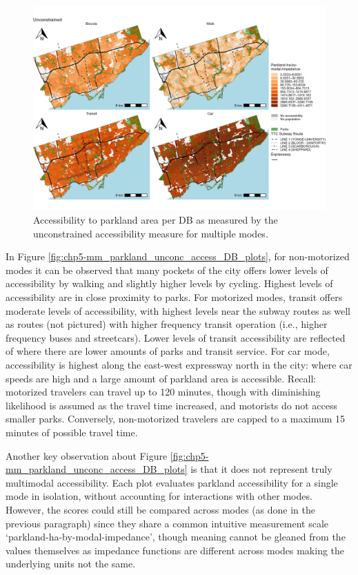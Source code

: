 \documentclass[
11pt, %
oneside, %
english, %
singlespacing, %
]{macthesis} %
\begin{document}
\begin{figure}

{\centering \includegraphics[width=6in]{./data/figures/chp5-mm_parkland_unconc_access_DB_plots} 

}

\caption{\label{fig:chp5-mm_parkland_unconc_access_DB_plots}Accessibility to parkland area per DB as measured by the unconstrained accessibility measure for multiple modes.}\label{fig:unnamed-chunk-74}
\end{figure}

In Figure \ref{fig:chp5-mm_parkland_unconc_access_DB_plots}, for non-motorized modes it can be observed that many pockets of the city offers lower levels of accessibility by walking and slightly higher levels by cycling. Highest levels of accessibility are in close proximity to parks. For motorized modes, transit offers moderate levels of accessibility, with highest levels near the subway routes as well as routes (not pictured) with higher frequency transit operation (i.e., higher frequency buses and streetcars). Lower levels of transit accessibility are reflected of where there are lower amounts of parks and transit service. For car mode, accessibility is highest along the east-west expressway north in the city: where car speeds are high and a large amount of parkland area is accessible. Recall: motorized travelers can travel up to 120 minutes, though with diminishing likelihood is assumed as the travel time increased, and motorists do not access smaller parks. Conversely, non-motorized travelers are capped to a maximum 15 minutes of possible travel time.

Another key observation about Figure \ref{fig:chp5-mm_parkland_unconc_access_DB_plots} is that it does not represent truly multimodal accessibility. Each plot evaluates parkland accessibility for a single mode in isolation, without accounting for interactions with other modes. However, the scores could still be compared across modes (as done in the previous paragraph) since they share a common intuitive measurement scale `parkland-ha-by-modal-impedance', though meaning cannot be gleaned from the values themselves as impedance functions are different across modes making the underlying units not the same.
\end{document}

